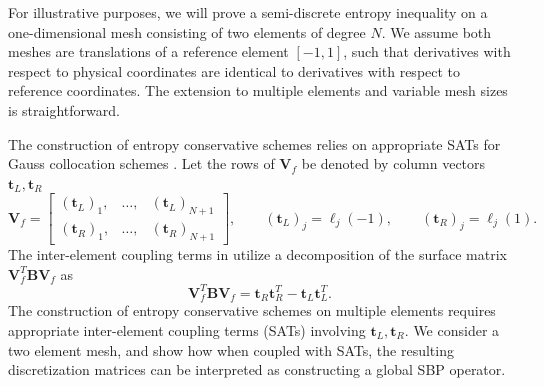 \documentclass[review,onefignum,onetabnum,final]{siamart171218}
\newcommand{\LRp}[1]{\left( #1 \right)}
\newcommand*{\horzbar}{\rule[.5ex]{2.5ex}{0.5pt}}
\begin{document}
For illustrative purposes, we will prove a semi-discrete entropy inequality on a one-dimensional mesh consisting of two elements of degree $N$.  We assume both meshes are translations of a reference element  $[-1,1]$, such that derivatives with respect to physical coordinates are identical to derivatives with respect to reference coordinates.  The extension to multiple elements and variable mesh sizes is straightforward.  

The construction of entropy conservative schemes relies on appropriate SATs for Gauss collocation schemes \cite{fernandez2014review, crean2017high, fernandez2018simultaneous}.  Let the rows of $\bm{V}_f$ be denoted by column vectors $\bm{t}_L, \bm{t}_R$ 
\[
\bm{V}_f = \begin{bmatrix}
\LRp{\bm{t}_L}_1, & \ldots, & \LRp{\bm{t}_L}_{N+1}\\
\LRp{\bm{t}_R}_1, & \ldots, & \LRp{\bm{t}_R}_{N+1}
\end{bmatrix}, \qquad \LRp{\bm{t}_L}_j = \ell_j(-1), \qquad \LRp{\bm{t}_R}_j = \ell_j(1).
\]
The inter-element coupling terms in \cite{fernandez2014review, crean2017high, fernandez2018simultaneous} utilize a decomposition of the surface matrix $\bm{V}_f^T\bm{B}\bm{V}_f$ as  
\begin{equation}
\bm{V}_f^T\bm{B}\bm{V}_f 
= \bm{t}_R\bm{t}_R^T - \bm{t}_L\bm{t}_L^T.
\label{eq:bmatdecomp}
\end{equation}
The construction of entropy conservative schemes on multiple elements requires appropriate inter-element coupling terms (SATs) involving $\bm{t}_L, \bm{t}_R$.  We consider a two element mesh, and show how when coupled with SATs, the resulting discretization matrices can be interpreted as constructing a global SBP operator.  
\end{document}
